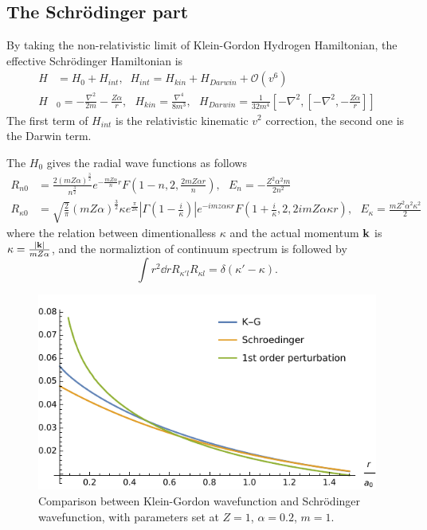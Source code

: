 \documentclass[aps,prd,preprint,showkeys,10pt]{revtex4-1}
\newcommand{\vbk}{\vb{k}}
\renewcommand{\a}{\alpha}
\newcommand{\ka}{\kappa}
\begin{document}
\subsection{The Schr\"odinger part}

By taking the non-relativistic limit of Klein-Gordon Hydrogen Hamiltonian, the effective Schr\"odinger Hamiltonian is\cite{Holstein2014}
\begin{align}
	H & =H_0+H_{int} ,\;\;H_{int}=H_{kin}+H_{Darwin}+\mathcal{O}(v^6)                                                                                            \\
	H & _0=-\frac{\nabla^2}{2m}-\frac{Z\alpha}{r},\ \ \ H_{kin}=\frac{\nabla^4}{8m^3},\ \ \ H_{Darwin}=\frac{1}{32m^4}[-\nabla^2,[-\nabla^2,-\frac{Z\alpha}{r}]]
\end{align}
The first term of $H_{int}$ is the relativistic kinematic $v^2$ correction, the second one is the Darwin term.

The $H_0$ gives the radial wave functions as follows
\begin{align}
	R_{n0}       & =\frac{2(mZ\alpha)^\frac{3}{2}}{n^\frac{3}{2}}e^{-\frac{mZ\alpha}{n}r}F(1-n,2,\frac{2mZ\alpha r}{n}),\ \ \ E_n=-\frac{Z^2\alpha^2m}{2n^2}                                                                             \\
	R_{\kappa 0} & =\sqrt{\frac{2}{\pi}}(mZ\alpha)^\frac{3}{2}\kappa e^\frac{\pi}{2\kappa}|\Gamma(1-\frac{i}{\kappa})|e^{-imz\alpha \kappa r}F(1+\frac{i}{\kappa},2,2imZ\alpha \kappa r),\ \ \ E_{\kappa}=\frac{mZ^2\alpha^2\kappa^2}{2}
\end{align}
where the relation between dimentionalless $\ka$ and the actual momentum $\vbk$ is $\kappa=\frac{\abs{\vbk}}{m Z \a}$, and the normaliztion of continuum spectrum is followed by $$\int r^2\dd rR_{\ka' l}R_{\ka l}=\delta(\ka'-\ka).$$
\begin{figure}
	\centering
	\includegraphics[width=3.9 in]{K-G-fig.pdf}
	\caption{Comparison between Klein-Gordon wavefunction and Schr\"odinger wavefunction, with parameters set at $Z=1$, $\a=0.2$, $m=1$. }
\end{figure}
\end{document}
